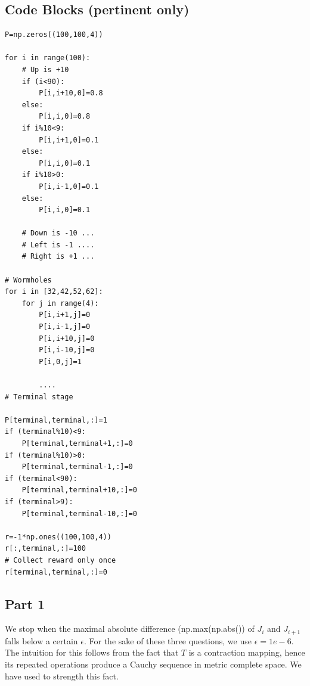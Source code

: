 \subsection{Code Blocks (pertinent only)}

\begin{lstlisting}
P=np.zeros((100,100,4))

for i in range(100):
    # Up is +10
    if (i<90):
        P[i,i+10,0]=0.8
    else:
        P[i,i,0]=0.8
    if i%10<9:
        P[i,i+1,0]=0.1
    else:
        P[i,i,0]=0.1
    if i%10>0:
        P[i,i-1,0]=0.1
    else:
        P[i,i,0]=0.1

    # Down is -10 ...
    # Left is -1 ....
    # Right is +1 ...
    
# Wormholes
for i in [32,42,52,62]:
    for j in range(4):
        P[i,i+1,j]=0
        P[i,i-1,j]=0
        P[i,i+10,j]=0
        P[i,i-10,j]=0
        P[i,0,j]=1
        
        ....
# Terminal stage

P[terminal,terminal,:]=1
if (terminal%10)<9:
    P[terminal,terminal+1,:]=0
if (terminal%10)>0:
    P[terminal,terminal-1,:]=0
if (terminal<90):
    P[terminal,terminal+10,:]=0
if (terminal>9):
    P[terminal,terminal-10,:]=0

r=-1*np.ones((100,100,4))
r[:,terminal,:]=100
# Collect reward only once
r[terminal,terminal,:]=0
\end{lstlisting}

\subsection{Part 1}

We stop when the maximal absolute difference (np.max(np.abs()) of $J_i$ and $J_{i+1}$ falls below a certain $\epsilon$. For the sake of these three questions, we use $\epsilon = 1e-6$. \\

The intuition for this follows from the fact that $T$ is a contraction mapping, hence its repeated operations produce a Cauchy sequence in metric complete space. We have used to strength this fact.

